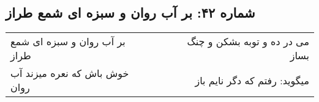 \begin{center}
\section*{شماره ۴۲: بر آب روان و سبزه ای شمع طراز}
\label{sec:042}
\begin{longtable}{l p{0.5cm} r}
بر آب روان و سبزه ای شمع طراز
&&
می در ده و توبه بشکن و چنگ بساز
\\
خوش باش که نعره میزند آب روان
&&
میگوید: رفتم که دگر نایم باز
\\
\end{longtable}
\end{center}
